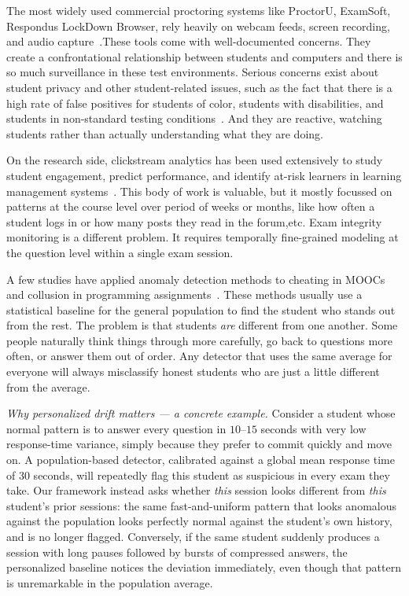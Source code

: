 \documentclass[sigconf]{acmart}
\begin{document}
The most widely used commercial proctoring systems like ProctorU, ExamSoft, Respondus LockDown Browser, rely heavily on webcam feeds, screen recording, and audio capture~\cite{nigam2021systematic}.These tools come with well-documented concerns. They create a confrontational relationship between students and computers and there is so much surveillance in these test environments. Serious concerns exist about student privacy and other student-related issues, such as the fact that there is a high rate of false positives for students of color, students with disabilities, and students in non-standard testing conditions~\cite{swauger2020software}. And they are reactive, watching students rather than actually understanding what they are doing.

On the research side, clickstream analytics has been used extensively to study student engagement, predict performance, and identify at-risk learners in learning management systems~\cite{gardner2019evaluating, aljohani2019predicting, brinton2015mooc}. This body of work is valuable, but it mostly focussed on patterns at the course level over period of weeks or months, like how often a student logs in or how many posts they read in the forum,etc. Exam integrity monitoring is a different problem. It requires temporally fine-grained modeling at the question level within a single exam session.


A few studies have applied anomaly detection methods to cheating in MOOCs~\cite{ruiperez2017detection, alexandron2019fraud} and collusion in programming assignments~\cite{li2015detecting}. These methods usually use a statistical baseline for the general population to find the student who stands out from the rest. The problem is that students \textit{are} different from one another. Some people naturally think things through more carefully, go back to questions more often, or answer them out of order. Any detector that uses the same average for everyone will always misclassify honest students who are just a little different from the average.

\smallskip
\noindent\textit{Why personalized drift matters --- a concrete example.} Consider a student whose normal pattern is to answer every question in $10$--$15$ seconds with very low response-time variance, simply because they prefer to commit quickly and move on. A population-based detector, calibrated against a global mean response time of $30$ seconds, will repeatedly flag this student as suspicious in every exam they take. Our framework instead asks whether \emph{this} session looks different from \emph{this} student's prior sessions: the same fast-and-uniform pattern that looks anomalous against the population looks perfectly normal against the student's own history, and is no longer flagged. Conversely, if the same student suddenly produces a session with long pauses followed by bursts of compressed answers, the personalized baseline notices the deviation immediately, even though that pattern is unremarkable in the population average.
\end{document}
